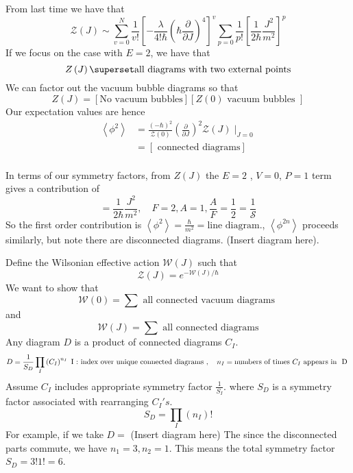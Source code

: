 \documentclass[11pt, oneside]{article}   	%
\theoremstyle{slanted}
\begin{document}
From last time 
we have that \[
	\mathcal{ Z } \left( J  \right) 
	\sim \sum_{ v = 0 } ^{ N } \frac{1}{v ! } \left[  
	- \frac{\lambda}{4 ! \hbar } \left( \hbar \frac{\partial  }{\partial  J }   \right)  
^ 4 \right]  ^ v \sum _{ p = 0  } \frac{1}{p ! } \left[  
\frac{1}{2 \hbar } \frac{J ^ 2 }{ m ^ 2 } \right]   ^ p 
\] 
If we focus on the case with $ E   =   2 $, 
we have that 
\[
 Z \left( J  \right)  \superset \text{all diagrams with two external points}
\] 
We can factor out the vacuum bubble diagrams so that 
\[
 Z ( J )  = \left[  \text{No vacuum bubbles}  \right]  \left[  
 Z ( 0 ) \text{ vacuum bubbles }\right] 
\] 
Our expectation values 
are hence 
\begin{align*}
	\left< \phi ^ 2  \right> &=  \frac{ \left(  - \hbar  \right)^ 2   }{ 
	\mathcal{ Z } ( 0 ) } \left( \frac{\partial  }{\partial  J }   \right)^ 2  
	\mathcal{ Z } ( J ) \mid _{ J = 0 } \\ 
	&=  \left[  \text{ connected diagrams} \right]  \\
\end{align*}

In terms of our symmetry factors, 
from $ Z ( J ) $ the $ E = 2 $ , $ V  = 0 $, $ P = 1 $ 
term 
gives a contribution of 
\[
  = \frac{1}{2 \hbar } \frac{J^2}{m ^ 2 } , \quad F = 2, A = 1 , \frac{A}{F } 
   = \frac{1}{2 }  = \frac{1}{\mathcal{ S } }
\] So the first order contribution is 
$ \left< \phi ^ 2  \right> = \frac{\hbar}{m ^ 2 }  = \text{line diagram}$., 
$ \left< \phi ^{ 2n }  \right> $ proceeds similarly, but note 
there are disconnected diagrams. 
(Insert diagram here). 

Define the Wilsonian effective action $ \mathcal{ W } \left( J  \right)  $ 
such that 
\[
	\mathcal{ Z }\left( J \right)   = e ^{  - \mathcal{ W } \left( J  \right)  / \hbar }
\] We want to show that 
\[
	\mathcal{ W } \left( 0 \right)  = \sum \text{ all connected vacuum diagrams }
\] and 
\[
	\mathcal{ W } \left( J  \right)   = \sum \text{ all connected diagrams}
\] 
Any diagram $ D $ is a product of connected diagrams $ C _ I $. 
 \[
	 D  = \frac{1}{S _ D}\prod_{ I } \left( C _ I  \right)  ^{ n _ I } \text{ I : index over unique 
	 connected diagrams }, \quad n _ I  = \text{numbers of times } C _ I \text{ appears in } $ D $ 
\] Assume $ C _ I $ includes appropriate symmetry factor $ \frac{1}{S _ I } $. 
where $ S_ D $ is a symmetry factor 
associated with rearranging $ C _ I 's $. 
\[
	S _ D  = \prod _ I  \left( n _ I  \right)   !
\]
For example,  
if we take $ D  = $ (Insert diagram here)
The since the disconnected parts commute, 
we have  $ n_1  = 3 , n_2  = 1 $. 
This means the total symmetry factor $ S _ D = 3 ! 1!  = 6 $. 
\end{document}
